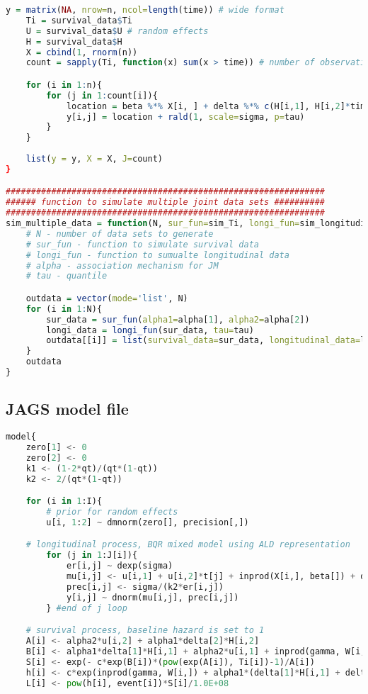 \documentclass{article}
\begin{document}
\begin{appendices}
\begin{lstlisting}[language=R]
	y = matrix(NA, nrow=n, ncol=length(time)) # wide format
	Ti = survival_data$Ti
	U = survival_data$U # random effects
	H = survival_data$H
	X = cbind(1, rnorm(n))
	count = sapply(Ti, function(x) sum(x > time)) # number of observations after drop-outs

	for (i in 1:n){
		for (j in 1:count[i]){
			location = beta %*% X[i, ] + delta %*% c(H[i,1], H[i,2]*time[j]) + U[i,] %*% c(1, time[j])
			y[i,j] = location + rald(1, scale=sigma, p=tau)		
		}	
	}
	
	list(y = y, X = X, J=count)		
}

###############################################################
###### function to simulate multiple joint data sets ##########
###############################################################
sim_multiple_data = function(N, sur_fun=sim_Ti, longi_fun=sim_longitudinal_data, alpha, tau){
	# N - number of data sets to generate
	# sur_fun - function to simulate survival data
	# longi_fun - function to sumualte longitudinal data
	# alpha - association mechanism for JM
	# tau - quantile

	outdata = vector(mode='list', N)
	for (i in 1:N){
		sur_data = sur_fun(alpha1=alpha[1], alpha2=alpha[2])
		longi_data = longi_fun(sur_data, tau=tau)
		outdata[[i]] = list(survival_data=sur_data, longitudinal_data=longi_data)		
	}
	outdata	
}

\end{lstlisting}





\subsection{JAGS model file}
\begin{lstlisting}[language=python]
model{
	zero[1] <- 0
	zero[2] <- 0
	k1 <- (1-2*qt)/(qt*(1-qt))
	k2 <- 2/(qt*(1-qt))

	for (i in 1:I){
		# prior for random effects
		u[i, 1:2] ~ dmnorm(zero[], precision[,])

	# longitudinal process, BQR mixed model using ALD representation
		for (j in 1:J[i]){
			er[i,j] ~ dexp(sigma)
			mu[i,j] <- u[i,1] + u[i,2]*t[j] + inprod(X[i,], beta[]) + delta[1]*H[i,1] + delta[2]*H[i,2]*t[j] + k1*er[i,j]
			prec[i,j] <- sigma/(k2*er[i,j])
			y[i,j] ~ dnorm(mu[i,j], prec[i,j])
		} #end of j loop		

	# survival process, baseline hazard is set to 1
	A[i] <- alpha2*u[i,2] + alpha1*delta[2]*H[i,2]
	B[i] <- alpha1*delta[1]*H[i,1] + alpha2*u[i,1] + inprod(gamma, W[i,])
	S[i] <- exp(- c*exp(B[i])*(pow(exp(A[i]), Ti[i])-1)/A[i])
	h[i] <- c*exp(inprod(gamma, W[i,]) + alpha1*(delta[1]*H[i,1] + delta[2]*H[i,2]*Ti[i]) + alpha2*(u[i,1] + u[i,2]*Ti[i]))
	L[i] <- pow(h[i], event[i])*S[i]/1.0E+08


\end{lstlisting}
\end{appendices}
\end{document}

